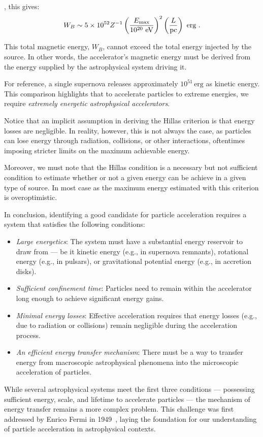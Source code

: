 , this gives:
\begin{equation}
W_B \sim 5 \times 10^{52} Z^{-1} \left( \frac{E_{\rm max}}{10^{20}~\text{eV}} \right)^2 \left( \frac{L}{\text{pc}} \right)~\text{erg}~.
\end{equation}

This total magnetic energy, \( W_B \), cannot exceed the total energy injected by the source. In other words, the accelerator’s magnetic energy must be derived from the energy supplied by the astrophysical system driving it.

For reference, a single supernova releases approximately \( 10^{51} \, \text{erg} \) as kinetic energy. This comparison highlights that to accelerate particles to extreme energies, we require \emph{extremely energetic astrophysical accelerators}.

Notice that an implicit assumption in deriving the Hillas criterion is that energy losses are negligible. In reality, however, this is not always the case, as particles can lose energy through radiation, collisions, or other interactions, oftentimes imposing stricter limits on the maximum achievable energy.

Moreover, we must note that the Hillas condition is a necessary but not suﬃcient condition to estimate whether or not a given energy can be achieve in a given type of source. In most case as the maximum energy estimated with this criterion is overoptimistic. 

In conclusion, identifying a good candidate for particle acceleration requires a system that satisfies the following conditions:  
\begin{itemize}
\item \emph{Large energetics}: The system must have a substantial energy reservoir to draw from --- be it kinetic energy (e.g., in supernova remnants), rotational energy (e.g., in pulsars), or gravitational potential energy (e.g., in accretion disks).
\item \emph{Sufficient confinement time}: Particles need to remain within the accelerator long enough to achieve significant energy gains.
\item \emph{Minimal energy losses}: Effective acceleration requires that energy losses (e.g., due to radiation or collisions) remain negligible during the acceleration process.
\item \emph{An efficient energy transfer mechanism}: There must be a way to transfer energy from macroscopic astrophysical phenomena into the microscopic acceleration of particles.
\end{itemize}

While several astrophysical systems meet the first three conditions --- possessing sufficient energy, scale, and lifetime to accelerate particles --- the mechanism of energy transfer remains a more complex problem. This challenge was first addressed by Enrico Fermi in 1949~\cite{}, laying the foundation for our understanding of particle acceleration in astrophysical contexts.
